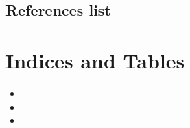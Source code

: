 \documentclass[letterpaper,10pt,english]{sphinxmanual}
\begin{document}
\section{References list}
\label{\detokenize{biblio:references-list}}

\chapter{Indices and Tables}
\label{\detokenize{index:indices-and-tables}}\begin{itemize}
\item {} 
\sphinxAtStartPar
{}

\item {} 
\sphinxAtStartPar
{}

\item {} 
\sphinxAtStartPar
{}

\end{itemize}
\end{document}
